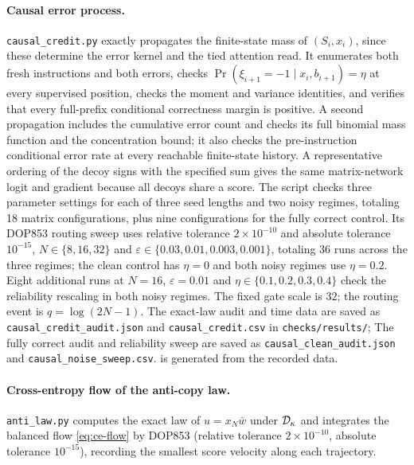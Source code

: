 \paragraph{Causal error process.}
\texttt{causal\_credit.py} exactly propagates the finite-state mass of $(S_i,x_i)$, since these determine the error kernel and the tied attention read.
It enumerates both fresh instructions and both errors, checks $\Pr(\xi_{i+1}=-1\mid x_i,b_{i+1})=\eta$ at every supervised position,
checks the moment and variance identities, and verifies that every full-prefix conditional correctness margin is positive.
A second propagation includes the cumulative error count and checks its full binomial mass function and the concentration bound;
it also checks the pre-instruction conditional error rate at every reachable finite-state history.
A representative ordering of the decoy signs with the specified sum gives the same matrix-network logit and gradient because all decoys share a score.
The script checks three parameter settings for each of three seed lengths and two noisy regimes, totaling 18 matrix configurations,
plus nine configurations for the fully correct control.
Its DOP853 routing sweep uses relative tolerance $2\times10^{-10}$ and absolute tolerance $10^{-15}$,
$N\in\{8,16,32\}$ and $\varepsilon\in\{0.03,0.01,0.003,0.001\}$, totaling 36 runs across the three regimes;
the clean control has $\eta=0$ and both noisy regimes use $\eta=0.2$.
Eight additional runs at $N=16$, $\varepsilon=0.01$ and $\eta\in\{0.1,0.2,0.3,0.4\}$ check the reliability rescaling in both noisy regimes.
The fixed gate scale is $32$; the routing event is $q=\log(2N-1)$.
The exact-law audit and time data are saved as \texttt{causal\_credit\_audit.json} and \texttt{causal\_credit.csv} in \texttt{checks/results/};
The fully correct audit and reliability sweep are saved as \texttt{causal\_clean\_audit.json} and \texttt{causal\_noise\_sweep.csv}.
 is generated from the recorded data.

\paragraph{Cross-entropy flow of the anti-copy law.}
\texttt{anti\_law.py} computes the exact law of $u=x_N\bar w$ under $\mathcal D_{\kappa}$ and integrates the balanced flow \cref{eq:ce-flow}
by DOP853 (relative tolerance $2\times10^{-10}$, absolute tolerance $10^{-15}$), recording the smallest score velocity along each trajectory.

